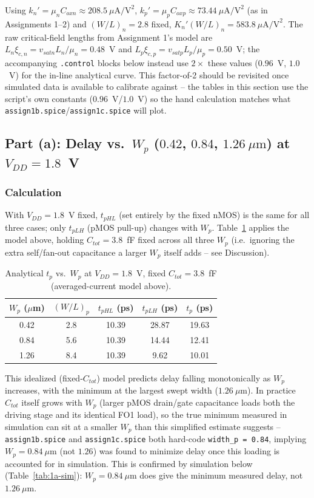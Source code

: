 Using $k_n'=\mu_nC_{oxn}\approx208.5\ \mu\text{A/V}^2$, $k_p'=\mu_pC_{oxp}
\approx73.44\ \mu\text{A/V}^2$ (as in Assignments 1--2) and $(W/L)_n=2.8$
fixed, $K_n'(W/L)_n = 583.8\ \mu\text{A/V}^2$. The raw critical-field lengths
from Assignment 1's model are $L_n\xi_{c,n}=v_{satn}L_n/\mu_n=0.48$~V and
$L_p\xi_{c,p}=v_{satp}L_p/\mu_p=0.50$~V; the accompanying \texttt{.control}
blocks below instead use $2\times$ these values ($0.96$~V, $1.0$~V) for the
in-line analytical curve. This factor-of-2 should be revisited once simulated
data is available to calibrate against -- the tables in this section use the
script's own constants ($0.96$~V/$1.0$~V) so the hand calculation matches
what \texttt{assign1b.spice}/\texttt{assign1c.spice} will plot.

\subsection{Part (a): Delay vs.\ $W_p$ ($0.42$, $0.84$, $1.26\ \mu\text{m}$) at $V_{DD}=1.8$~V}

\subsubsection{Calculation}

With $V_{DD}=1.8$~V fixed, $t_{pHL}$ (set entirely by the fixed nMOS) is the
same for all three cases; only $t_{pLH}$ (pMOS pull-up) changes with $W_p$.
Table~\ref{tab:1a-analytical} applies the model above, holding $C_{tot}=3.8$~fF
fixed across all three $W_p$ (i.e.\ ignoring the extra self/fan-out
capacitance a larger $W_p$ itself adds -- see Discussion).

\begin{table}[h]
  \centering
  \begin{tabular}{|c|c|c|c|c|}
    \hline
    $W_p$ ($\mu$m) & $(W/L)_p$ & $t_{pHL}$ (ps) & $t_{pLH}$ (ps) & $t_p$ (ps) \\
    \hline
    0.42 & 2.8 & 10.39 & 28.87 & 19.63 \\
    0.84 & 5.6 & 10.39 & 14.44 & 12.41 \\
    1.26 & 8.4 & 10.39 & 9.62  & 10.01 \\
    \hline
  \end{tabular}
  \caption{Analytical $t_p$ vs.\ $W_p$ at $V_{DD}=1.8$~V, fixed $C_{tot}=3.8$~fF
  (averaged-current model above).}
  \label{tab:1a-analytical}
\end{table}

This idealized (fixed-$C_{tot}$) model predicts delay falling monotonically as
$W_p$ increases, with the minimum at the largest swept width ($1.26\
\mu\text{m}$). In practice $C_{tot}$ itself grows with $W_p$ (larger pMOS
drain/gate capacitance loads both the driving stage and its identical FO1
load), so the true minimum measured in simulation can sit at a smaller $W_p$
than this simplified estimate suggests -- \texttt{assign1b.spice} and
\texttt{assign1c.spice} both hard-code \texttt{width\_p = 0.84}, implying
$W_p=0.84\ \mu\text{m}$ (not $1.26$) was found to minimize delay once this
loading is accounted for in simulation. This is confirmed by simulation below
(Table~\ref{tab:1a-sim}): $W_p=0.84\ \mu\text{m}$ does give the minimum
measured delay, not $1.26\ \mu\text{m}$.

